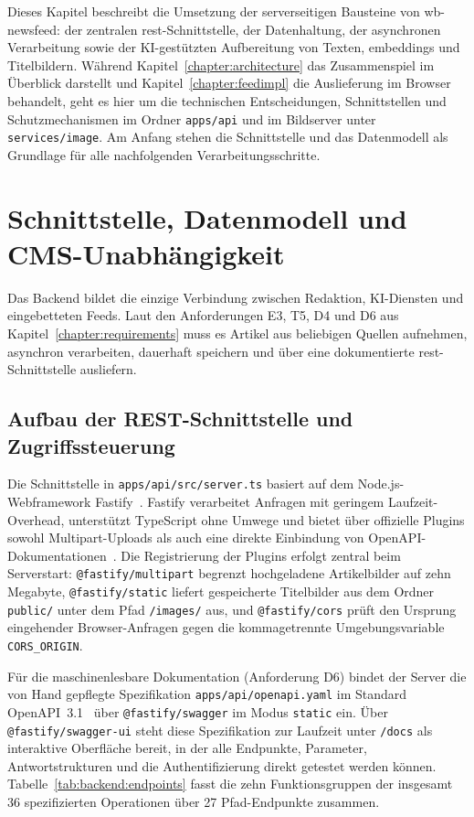 Dieses Kapitel beschreibt die Umsetzung der serverseitigen Bausteine von wb-newsfeed: der zentralen \gls{rest}-Schnittstelle, der Datenhaltung, der asynchronen Verarbeitung sowie der KI-gestützten Aufbereitung von Texten, \glspl{embedding} und Titelbildern.\kihinweis{}
Während Kapitel~\ref{chapter:architecture} das Zusammenspiel im Überblick darstellt und Kapitel~\ref{chapter:feedimpl} die Auslieferung im Browser behandelt, geht es hier um die technischen Entscheidungen, Schnittstellen und Schutzmechanismen im Ordner \texttt{apps/api} und im Bildserver unter \texttt{services/image}.
Am Anfang stehen die Schnittstelle und das Datenmodell als Grundlage für alle nachfolgenden Verarbeitungsschritte.

\section{Schnittstelle, Datenmodell und CMS-Unabhängigkeit}\label{sec:backend:api}
\setauthor{\firstauthor}

Das Backend bildet die einzige Verbindung zwischen Redaktion, KI-Diensten und eingebetteten Feeds.
Laut den Anforderungen E3, T5, D4 und D6 aus Kapitel~\ref{chapter:requirements} muss es Artikel aus beliebigen Quellen aufnehmen, asynchron verarbeiten, dauerhaft speichern und über eine dokumentierte \gls{rest}-Schnittstelle ausliefern.

\subsection{Aufbau der REST-Schnittstelle und Zugriffssteuerung}

Die Schnittstelle in \texttt{apps/api/src/server.ts} basiert auf dem Node.js-Webframework Fastify~\cite{fastify}.
Fastify verarbeitet Anfragen mit geringem Laufzeit-Overhead, unterstützt TypeScript ohne Umwege und bietet über offizielle Plugins sowohl Multipart-Uploads als auch eine direkte Einbindung von OpenAPI-Dokumentationen~\cite{fastify}.
Die Registrierung der Plugins erfolgt zentral beim Serverstart: \texttt{@fastify/multipart} begrenzt hochgeladene Artikelbilder auf zehn Megabyte, \texttt{@fastify/static} liefert gespeicherte Titelbilder aus dem Ordner \texttt{public/} unter dem Pfad \texttt{/images/} aus, und \texttt{@fastify/cors} prüft den Ursprung eingehender Browser-Anfragen gegen die kommagetrennte Umgebungsvariable \texttt{CORS\_ORIGIN}.

Für die maschinenlesbare Dokumentation (Anforderung D6) bindet der Server die von Hand gepflegte Spezifikation \texttt{apps/api/openapi.yaml} im Standard OpenAPI~3.1~\cite{openapi31} über \texttt{@fastify/swagger} im Modus \texttt{static} ein.
Über \texttt{@fastify/swagger-ui} steht diese Spezifikation zur Laufzeit unter \texttt{/docs} als interaktive Oberfläche bereit, in der alle Endpunkte, Parameter, Antwortstrukturen und die Authentifizierung direkt getestet werden können.
Tabelle~\ref{tab:backend:endpoints} fasst die zehn Funktionsgruppen der insgesamt 36 spezifizierten Operationen über 27 Pfad-Endpunkte zusammen.

